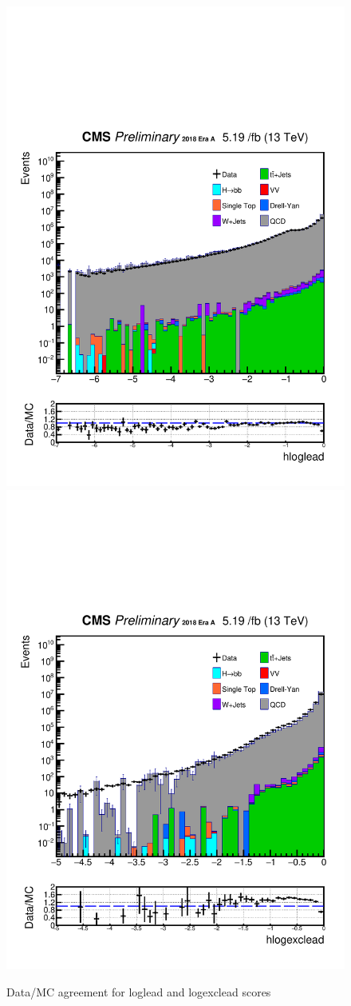 \begin{figure}[h!]
  \caption{Data/MC agreement for loglead and logexclead scores}
  \label{fig:DataMCscore}
  \centering
  \includegraphics[width=0.67\linewidth]{figs/Data_log_Oct6ANVars_MS-15_ctauS-10_hloglead.pdf}
  \includegraphics[width=0.67\linewidth]{figs/Data_log_Oct6ANVars_MS-15_ctauS-10_hlogexclead.pdf}
\end{figure}

